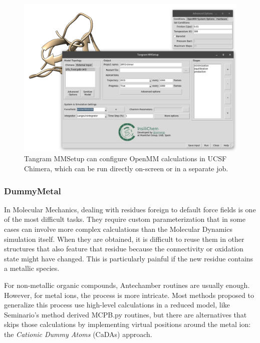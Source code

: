 \begin{figure}
	\begin{Center}
		\includegraphics[width=\textwidth]{./figures/05/tangram_mm.png}
	\end{Center}
	\caption[Tangram MMSetup]{Tangram MMSetup can configure OpenMM calculations in UCSF Chimera, which can be run directly on-screen or in a separate job.}
	\label{fig:tangram-mmsetup}
\end{figure}


\subsubsection{DummyMetal}
In Molecular Mechanics, dealing with residues foreign to default force fields is one of the most difficult tasks. They require custom parameterization that in some cases can involve more complex calculations than the Molecular Dynamics simulation itself. When they are obtained, it is difficult to reuse them in other structures that also feature that residue because the connectivity or oxidation state might have changed. This is particularly painful if the new residue contains a metallic species.

For non-metallic organic compounds, Antechamber\cite{wang2001antechamber} routines are usually enough. However, for metal ions, the process is more intricate. Most methods proposed to generalize this process use high-level calculations in a reduced model, like Seminario's method derived MCPB.py routines,\cite{mcpbpy} but there are alternatives that skips those calculations by implementing virtual positions around the metal ion: the \textit{Cationic Dummy Atoms} (CaDAs) approach.\cite{duarte2014}

